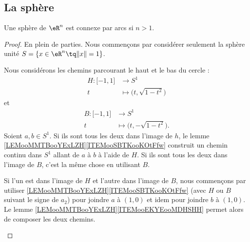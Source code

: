 \subsection{La sphère}


\begin{lemma}       \label{LEMooQFQFooDlxkw}
	Une sphère de \( \eR^n\) est connexe par arcs si \( n >1\).
\end{lemma}

\begin{proof}
	En plein de parties. Nous commençons par considérer seulement la sphère unité \( S=\{ x\in \eR^n\tq \| x \|=1 \}\).
	\begin{subproof}
		\spitem[Pour le cercle (\( n=2\))]		\label{SPITEMooGDRIooZJXAIC}
		Nous considérons les chemins parcourant le haut et le bas du cercle :
		\begin{equation}
			\begin{aligned}
				H\colon \mathopen[ -1,1\mathclose] & \to S^1                              \\
				t                                  & \mapsto \big( t,\sqrt{ 1-t^2 } \big)
			\end{aligned}
		\end{equation}
		et
		\begin{equation}
			\begin{aligned}
				B\colon \mathopen[ -1,1\mathclose] & \to S^1                                \\
				t                                  & \mapsto \big( t,-\sqrt{ 1-t^2 } \big).
			\end{aligned}
		\end{equation}
		Soient \( a,b\in S^1\). Si ils sont tous les deux dans l'image de \( h\), le lemme \ref{LEMooMMTBooYExLZH}\ref{ITEMooSBTKooKOtFfw} construit un chemin continu dans \( S^1\) allant de \( a\) à \( b\) à l'aide de \( H\). Si ils sont tous les deux dans l'image de \( B\), c'est la même chose en utilisant \( B\).

		Si l'un est dans l'image de \( H\) et l'autre dans l'image de \( B\), nous commençons par utiliser \ref{LEMooMMTBooYExLZH}\ref{ITEMooSBTKooKOtFfw} (avec \( H\) ou \( B\) suivant le signe de \( a_2\)) pour joindre \( a\) à \( (1,0)\) et idem pour joindre \( b\) à \( (1,0)\). Le lemme \ref{LEMooMMTBooYExLZH}\ref{ITEMooEKYEooMDHSHH} permet alors de composer les deux chemins.


\end{subproof}
\end{proof}
